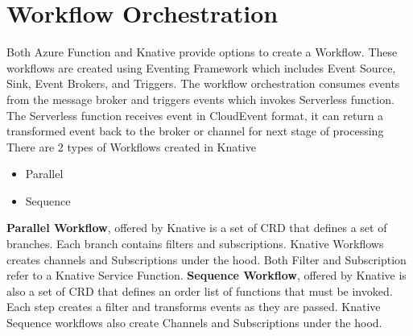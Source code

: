 \documentclass{article}
\begin{document}
\section{Workflow Orchestration }
\begin{flushleft}
Both Azure Function and Knative provide options to create a Workflow. These workflows are created using Eventing Framework which includes Event Source, Sink, Event Brokers, and Triggers. 
\hfill\break
The workflow orchestration consumes events from the message broker and triggers events which invokes Serverless function. The Serverless function receives event in CloudEvent format, it can return a transformed event back to the broker or channel for next stage of processing
\hfill \break
There are 2 types of Workflows created in Knative 
\begin{itemize}
    \item Parallel
    \item Sequence
\end{itemize}
\textbf{Parallel Workflow}, offered by Knative is a set of CRD that defines a set of branches. Each branch contains filters and subscriptions. Knative Workflows creates channels and Subscriptions under the hood. Both Filter and Subscription refer to a Knative Service Function.
\hfill \break
\textbf{Sequence Workflow}, offered by Knative is also a set of CRD that defines an order list of functions that must be invoked. Each step creates a filter and transforms events as they are passed. Knative Sequence workflows also create Channels and Subscriptions under the hood.
\end{flushleft}
\pagebreak
\end{document}
